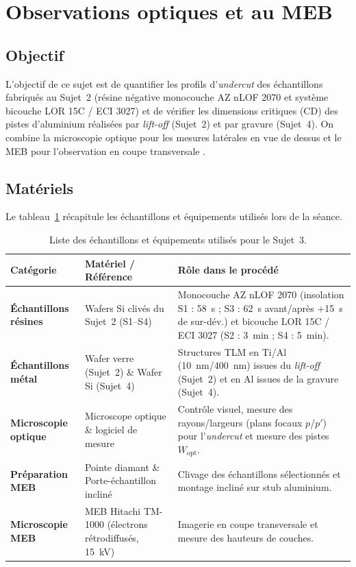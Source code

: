 \section[Observations optiques et au MEB]{Observations optiques et au MEB}

\subsection{Objectif}
L'objectif de ce sujet est de quantifier les profils d'\emph{undercut} des échantillons fabriqués au Sujet~2 (résine négative monocouche AZ nLOF 2070 et système bicouche LOR 15C / ECI 3027) et de vérifier les dimensions critiques (CD) des pistes d'aluminium réalisées par \emph{lift-off} (Sujet~2) et par gravure (Sujet~4). On combine la microscopie optique pour les mesures latérales en vue de dessus et le MEB pour l'observation en coupe transversale \cite{prot3}.

\subsection{Matériels}
Le tableau~\ref{tab:s3-materiel} récapitule les échantillons et équipements utilisés lors de la séance.

\begin{table}[H]
  \centering\small
  \caption{Liste des échantillons et équipements utilisés pour le Sujet~3.}
  \label{tab:s3-materiel}
  \begin{tabularx}{\linewidth}{@{}l p{4.6cm} X@{}}
    \toprule
    \textbf{Catégorie} & \textbf{Matériel / Référence} & \textbf{Rôle dans le procédé} \\
    \midrule
    \textbf{Échantillons résines} & Wafers Si clivés du Sujet~2 (S1--S4) & Monocouche AZ nLOF 2070 (insolation S1 : \qty{58}{\second} ; S3 : \qty{62}{\second} avant/après +\qty{15}{\second} de sur-dév.) et bicouche LOR 15C / ECI 3027 (S2 : \qty{3}{\minute} ; S4 : \qty{5}{\minute}). \\
    \addlinespace[2pt]
    \textbf{Échantillons métal} & Wafer verre (Sujet~2) \& Wafer Si (Sujet~4) & Structures TLM en Ti/Al (\qty{10}{\nano\metre}/\qty{400}{\nano\metre}) issues du \emph{lift-off} (Sujet~2) et en Al issues de la gravure (Sujet~4). \\
    \addlinespace[2pt]
    \textbf{Microscopie optique} & Microscope optique \& logiciel de mesure & Contrôle visuel, mesure des rayons/largeurs (plans focaux $p$/$p'$) pour l'\emph{undercut} et mesure des pistes $W_{\text{opt}}$. \\
    \addlinespace[2pt]
    \textbf{Préparation MEB} & Pointe diamant \& Porte-échantillon incliné & Clivage des échantillons sélectionnés et montage incliné sur stub aluminium. \\
    \addlinespace[2pt]
    \textbf{Microscopie MEB} & MEB Hitachi TM-1000 \cite{tm1000} (électrons rétrodiffusés, \qty{15}{\kilo\volt}) & Imagerie en coupe transversale et mesure des hauteurs de couches. \\
    \bottomrule
  \end{tabularx}
\end{table}

